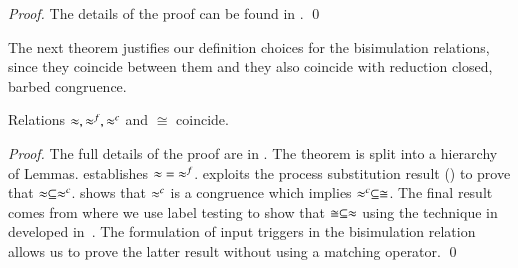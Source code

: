 \begin{proof}
	The details of the proof can be found in .
	\qed
\end{proof}

The next theorem justifies our definition choices
for the bisimulation relations, since
they coincide between them and they also
coincide with reduction closed, barbed congruence.

\begin{theorem}[Coincidence]\rm
	\label{the:coincidence}
	Relations $\approx, \approx^f, \approx^{c}$ and $\cong$ coincide.
\end{theorem}

\begin{proof}
	The full details of the proof are in .
	The theorem is split into a hierarchy of Lemmas. 
	 establishes $\approx\ =\ \approx^{f}$.
	 exploits the process substitution result
	() to prove that $\approx \subseteq \approx^{c}$.
	 shows that $\approx^{c}$ is a congruence
	which implies $\approx^{c} \subseteq \cong$.
	The final result comes from  where
	we use label testing to show that $\cong \subseteq \approx$ using
	the technique in developed in~\cite{Hennessy07}. The formulation of input
	triggers in the bisimulation relation allows us to prove
	the latter result without using a matching operator.
	\qed
\end{proof}

%

